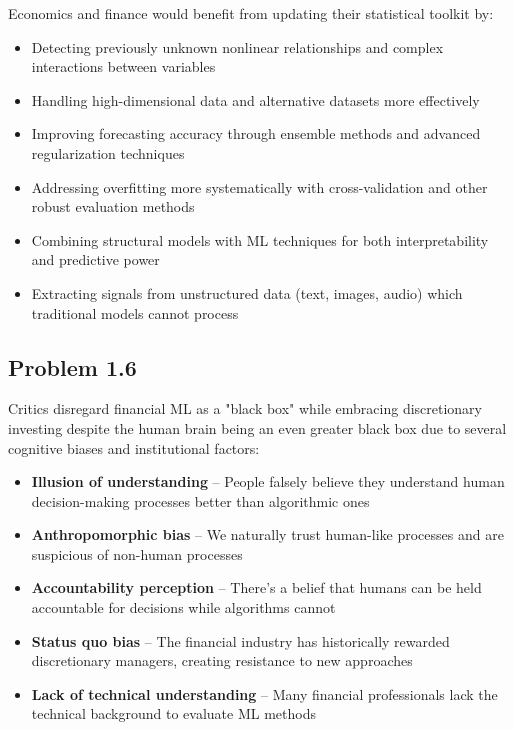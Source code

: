 \documentclass{article}
\begin{document}
\begin{sloppypar}
Economics and finance would benefit from updating their statistical toolkit by:
\begin{itemize}
    \item Detecting previously unknown nonlinear relationships and complex interactions between variables
    \item Handling high-dimensional data and alternative datasets more effectively
    \item Improving forecasting accuracy through ensemble methods and advanced regularization techniques
    \item Addressing overfitting more systematically with cross-validation and other robust evaluation methods
    \item Combining structural models with ML techniques for both interpretability and predictive power
    \item Extracting signals from unstructured data (text, images, audio) which traditional models cannot process
\end{itemize}

\subsection{Problem 1.6}
Critics disregard financial ML as a "black box" while embracing discretionary investing despite the human brain being an even greater black box due to several cognitive biases and institutional factors:

\begin{itemize}
    \item \textbf{Illusion of understanding} -- People falsely believe they understand human decision-making processes better than algorithmic ones
    
    \item \textbf{Anthropomorphic bias} -- We naturally trust human-like processes and are suspicious of non-human processes
    
    \item \textbf{Accountability perception} -- There's a belief that humans can be held accountable for decisions while algorithms cannot
    
    \item \textbf{Status quo bias} -- The financial industry has historically rewarded discretionary managers, creating resistance to new approaches
    
    \item \textbf{Lack of technical understanding} -- Many financial professionals lack the technical background to evaluate ML methods
    

\end{itemize}
\end{sloppypar}
\end{document}
